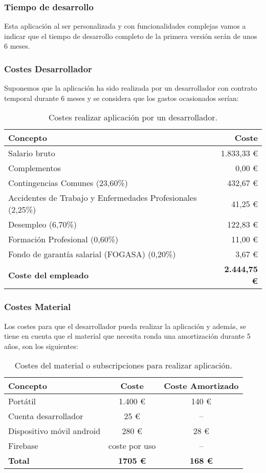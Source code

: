 \subsubsection{Tiempo de desarrollo}
Esta aplicación al ser personalizada y con funcionalidades complejas vamos a indicar que el tiempo de desarrollo completo de la primera versión serán de unos 6 meses.

\subsubsection{Costes Desarrollador}
Suponemos que la aplicación ha sido realizada por un desarrollador con contrato temporal durante 6 meses y se considera que los gastos ocasionados serían:
\begin{table}[H]
\centering
\begin{tabular}{lr}
\toprule
Concepto	&	Coste   \\
\midrule
Salario bruto & 1.833,33 €\\
Complementos & 0,00 €\\
Contingencias Comunes (23,60\%) & 432,67 €\\
Accidentes de Trabajo y Enfermedades Profesionales (2,25\%) & 41,25 €\\
Desempleo (6,70\%) & 122,83 € \\
Formación Profesional (0,60\%) & 11,00 € \\
Fondo de garantía salarial (FOGASA) (0,20\%) & 3,67 €\\
\textbf{Coste del empleado} & \textbf{2.444,75 €}\\
\bottomrule
\end{tabular}
\caption{Costes realizar aplicación por un desarrollador.}
\label{costesdesarrollador}
\end{table}

\subsubsection{Costes Material}
Los costes para que el desarrollador pueda realizar la aplicación y además, se tiene en cuenta que el material que necesita ronda una amortización durante 5 años, son los siguientes:
\begin{table}[H]
\centering
\begin{tabular}{lcc}
\toprule
Concepto	&	Coste	&	Coste Amortizado  \\
\midrule
Portátil & 1.400 €	& 140 € \\
Cuenta desarrollador & 25 € & --\\
Dispositivo móvil android & 280 € & 28 €\\
Firebase & coste por uso & --\\
\textbf{Total} & \textbf{1705 €} & \textbf{168 €}\\
\bottomrule
\end{tabular}
\caption{Costes del material o subscripciones para realizar aplicación.}
\label{costesmaterial}
\end{table}

